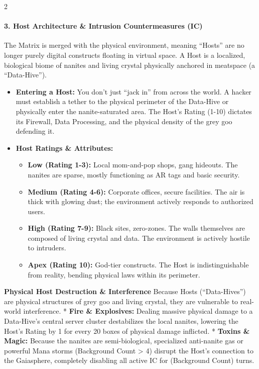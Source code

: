 \documentclass[
  oneside]{article}
\providecommand{\tightlist}{%
  \setlength{\itemsep}{0pt}\setlength{\parskip}{0pt}}
\begin{document}
\begin{multicols}{2}

\hypertarget{host-architecture-intrusion-countermeasures-ic}{%
\paragraph{3. Host Architecture \& Intrusion
Countermeasures
(IC)}\label{host-architecture-intrusion-countermeasures-ic}}

The Matrix is merged with the physical
environment, meaning ``Hosts'' are no longer
purely digital constructs floating in virtual
space. A Host is a localized, biological biome of
nanites and living crystal physically anchored in
meatspace (a ``Data-Hive'').

\begin{itemize}
\tightlist
\item
  \textbf{Entering a Host:} You don't just ``jack
  in'' from across the world. A hacker must
  establish a tether to the physical perimeter of
  the Data-Hive or physically enter the
  nanite-saturated area. The Host's Rating (1-10)
  dictates its Firewall, Data Processing, and the
  physical density of the grey goo defending it.
\item
  \textbf{Host Ratings \& Attributes:}

  \begin{itemize}
  \tightlist
  \item
    \textbf{Low (Rating 1-3):} Local mom-and-pop
    shops, gang hideouts. The nanites are sparse,
    mostly functioning as AR tags and basic
    security.
  \item
    \textbf{Medium (Rating 4-6):} Corporate
    offices, secure facilities. The air is thick
    with glowing dust; the environment actively
    responds to authorized users.
  \item
    \textbf{High (Rating 7-9):} Black sites,
    zero-zones. The walls themselves are composed
    of living crystal and data. The environment is
    actively hostile to intruders.
  \item
    \textbf{Apex (Rating 10):} God-tier
    constructs. The Host is indistinguishable from
    reality, bending physical laws within its
    perimeter.
  \end{itemize}
\end{itemize}

\textbf{Physical Host Destruction \& Interference}
Because Hosts (``Data-Hives'') are physical
structures of grey goo and living crystal, they
are vulnerable to real-world interference. *
\textbf{Fire \& Explosives:} Dealing massive
physical damage to a Data-Hive's central server
cluster destabilizes the local nanites, lowering
the Host's Rating by 1 for every 20 boxes of
physical damage inflicted. * \textbf{Toxins \&
Magic:} Because the nanites are semi-biological,
specialized anti-nanite gas or powerful Mana
storms (Background Count \textgreater{} 4) disrupt
the Host's connection to the Gaiasphere,
completely disabling all active IC for (Background
Count) turns.


\end{multicols}
\end{document}
